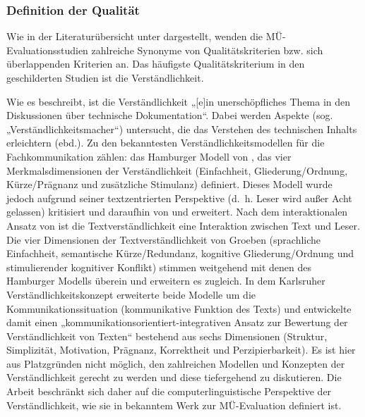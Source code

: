 \subsubsection{\label{sec:4.4.5.1}Definition der Qualität}

Wie in der Literaturübersicht unter  dargestellt, wenden die MÜ-Eva\-lua\-tions\-stu\-dien zahlreiche Synonyme von Qualitätskriterien bzw. sich überlappenden Kriterien an. Das häufigste Qualitätskriterium in den geschilderten Studien ist die Verständlichkeit.

Wie \citet[339]{Lehrndorfer1996b} es beschreibt, ist die Verständlichkeit „[e]in unerschöpfliches Thema in den Diskussionen über technische Dokumentation“. Dabei werden Aspekte (sog. „Verständlichkeitsmacher“) untersucht, die das Verstehen des technischen Inhalts erleichtern (ebd.). Zu den bekanntesten Verständlichkeitsmodellen für die Fachkommunikation zählen: das Hamburger Modell von \citet{LangerEtAl1974}, das vier Merkmalsdimensionen der Verständlichkeit (Einfachheit, Gliederung/Ordnung, Kürze/Prägnanz und zusätzliche Stimulanz) definiert. Dieses Modell wurde jedoch aufgrund seiner textzentrierten Perspektive (d.~h. Leser wird außer Acht gelassen) kritisiert und daraufhin von \citet{Groeben1982} und \citet{Göpferich2001} erweitert. Nach dem interaktionalen Ansatz von \citet{Groeben1982} ist die Textverständlichkeit eine Interaktion zwischen Text und Leser. Die vier Dimensionen der Textverständlichkeit von Groeben (sprachliche Einfachheit, semantische Kürze/Redundanz, kognitive Gliederung/Ordnung und stimulierender kognitiver Konflikt) stimmen weitgehend mit denen des Hamburger Modells überein und erweitern es zugleich. In dem Karlsruher Verständlichkeitskonzept erweiterte \citet{Göpferich2001} beide Modelle um die Kommunikationssituation (kommunikative Funktion des Texts) und entwickelte damit einen „kommunikationsorientiert-integrativen Ansatz zur Bewertung der Verständlichkeit von Texten“ bestehend aus sechs Dimensionen (Struktur, Simplizität, Motivation, Prägnanz, Korrektheit und Perzipierbarkeit). Es ist hier aus Platzgründen nicht möglich, den zahlreichen Modellen und Konzepten der Verständlichkeit gerecht zu werden und diese tiefergehend zu diskutieren. Die Arbeit beschränkt sich daher auf die computerlinguistische Perspektive der Verständlichkeit, wie sie in  bekanntem Werk zur MÜ-Evaluation definiert ist.

